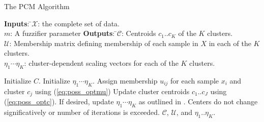 \documentclass[12pt,dvips]{report}
\numberwithin{equation}{section}
\begin{document}
\begin{algorithm}
  \caption{The PCM Algorithm}
  \label{alg:PCM}
  {\begin{tabbing}
  \textbf{Inputs}: \=$\mathcal{X}$: the complete set of data.\\
   \>$m$: A fuzzifier parameter
   \textbf{Outputs}: \=$\mathcal{C}$: Centroids $c_{1}..c_{K}$ of the $K$ clusters.\\
   \>$\mathcal{U}$: Membership matrix defining membership of each sample in $X$ in each of the $K$ clusters.\\
   \>$\eta_1 \cdots \eta_{K}$: cluster-dependent scaling vectors for each of the $K$ clusters.\\   
   \end{tabbing}}
  \begin{algorithmic}
    \STATE Initialize $C$.
    \STATE Initialize $\eta_{1} \cdots \eta_{K}$.
    \REPEAT 
       \STATE Assign membership $u_{ij}$ for each sample $x_{i}$ and cluster $c_{j}$ using (\ref{eq:poss_optmu})
       \STATE Update cluster centroids $c_{1}..c_{J}$ using (\ref{eq:poss_optc}).
       \STATE If desired, update $\eta_{1} \cdots \eta_{K}$ as outlined in \cite{PCM}.
    \UNTIL Centers do not change significatively or number of iterations is exceeded.
    \RETURN $\mathcal{C}$, $\mathcal{U}$, and $\eta_{1}..\eta_{K}$.
  \end{algorithmic}
\end{algorithm}

\end{document}
